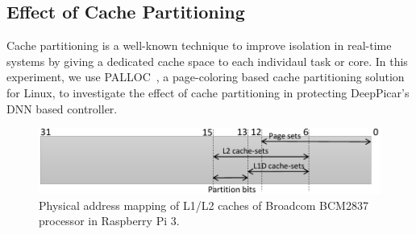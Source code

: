 \subsection{Effect of Cache Partitioning}





Cache partitioning is a well-known technique to improve isolation in
real-time systems by giving a dedicated cache space to each individaul
task or core. In this experiment, we use PALLOC~\cite{yun2014rtas}, a
page-coloring based cache partitioning solution for Linux, to
investigate the effect of cache partitioning in protecting DeepPicar's
DNN based controller.

\begin{figure}
  \centering
  \includegraphics[width=.5\textwidth]{figs/cache-mapping}
  \caption{Physical address mapping of L1/L2 caches of Broadcom
    BCM2837 processor in Raspberry Pi 3.}
  \label{fig:cache-mapping}
\end{figure}

